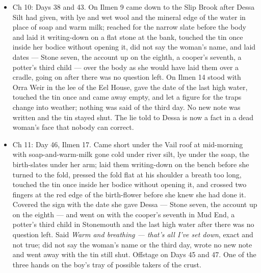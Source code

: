 \documentclass{design/chronicle}
\begin{document}
{\begin{itemize}[leftmargin=1.4em,itemsep=1pt,topsep=3pt,parsep=0pt]

\item Ch 10: Days 38 and 43. On Ilmen 9 came down to the Slip Brook after Dessa Silt had given, with lye and wet wool and the mineral edge of the water in place of soap and warm milk; reached for the narrow slate before the body and laid it writing-down on a flat stone at the bank, touched the tin once inside her bodice without opening it, did not say the woman’s name, and laid dates --- Stone seven, the account up on the eighth, a cooper’s seventh, a potter’s third child --- over the body as she would have laid them over a cradle, going on after there was no question left. On Ilmen 14 stood with Orra Weir in the lee of the Eel House, gave the date of the last high water, touched the tin once and came away empty, and let a figure for the traps change into weather; nothing was said of the third day. No new note was written and the tin stayed shut. The lie told to Dessa is now a fact in a dead woman’s face that nobody can correct.

\end{itemize}

\begin{itemize}[leftmargin=1.4em,itemsep=1pt,topsep=3pt,parsep=0pt]

\item Ch 11: Day 46, Ilmen 17. Came short under the Vail roof at mid-morning with soap-and-warm-milk gone cold under river silt, lye under the soap, the birth-slates under her arm; laid them writing-down on the bench before she turned to the fold, pressed the fold flat at his shoulder a breath too long, touched the tin once inside her bodice without opening it, and crossed two fingers at the red edge of the birth-flower before she knew she had done it. Covered the sign with the date she gave Dessa --- Stone seven, the account up on the eighth --- and went on with the cooper’s seventh in Mud End, a potter’s third child in Stonemouth and the last high water after there was no question left. Said \emph{Warm and breathing --- that’s all I’ve set down}, exact and not true; did not say the woman’s name or the third day, wrote no new note and went away with the tin still shut. Offstage on Days 45 and 47. One of the three hands on the boy’s tray of possible takers of the crust.

\end{itemize}

\begin{itemize}[leftmargin=1.4em,itemsep=1pt,topsep=3pt,parsep=0pt]


\end{itemize}}
\end{document}
